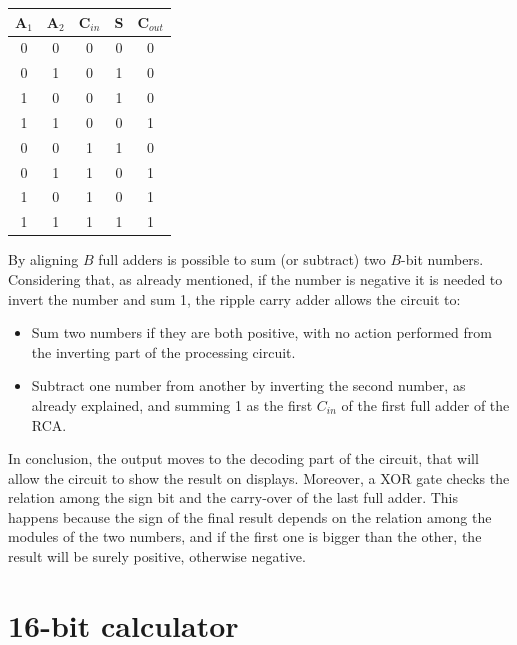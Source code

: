 \documentclass{article}
\begin{document}
\begin{table}[h]
  \centering
  \begin{tabular}{|| c | c | c || c | c ||}
  \hline
  A$_1$ & A$_2$ & C$_{in}$ & S & C$_{out}$ \\ \hline
  0 & 0 & 0 & 0 & 0 \\ \hline
  0 & 1 & 0 & 1 & 0 \\ \hline
  1 & 0 & 0 & 1 & 0 \\ \hline
  1 & 1 & 0 & 0 & 1 \\ \hline
  0 & 0 & 1 & 1 & 0 \\ \hline
  0 & 1 & 1 & 0 & 1 \\ \hline
  1 & 0 & 1 & 0 & 1 \\ \hline
  1 & 1 & 1 & 1 & 1 \\ \hline
  \end{tabular}
  \label{FullAdder}
\end{table}

By aligning $B$ full adders is possible to sum (or subtract) two $B$-bit numbers. Considering that, as already mentioned, if the number is negative it is needed to invert the number and sum 1, the ripple carry adder allows the circuit to:
\begin{itemize}
  \item Sum two numbers if they are both positive, with no action performed from the inverting part of the processing circuit.
  \item Subtract one number from another by inverting the second number, as already explained, and summing 1 as the first $C_{in}$ of the first full adder of the RCA.
\end{itemize}
  
In conclusion, the output moves to the decoding part of the circuit, that will allow the circuit to show the result on displays. Moreover, a XOR gate checks the relation among the sign bit and the carry-over of the last full adder. This happens because the sign of the final result depends on the relation among the modules of the two numbers, and if the first one is bigger than the other, the result will be surely positive, otherwise negative.





\clearpage








\clearpage

\section{16-bit calculator} \label{SimulatedCalculator}
\end{document}
